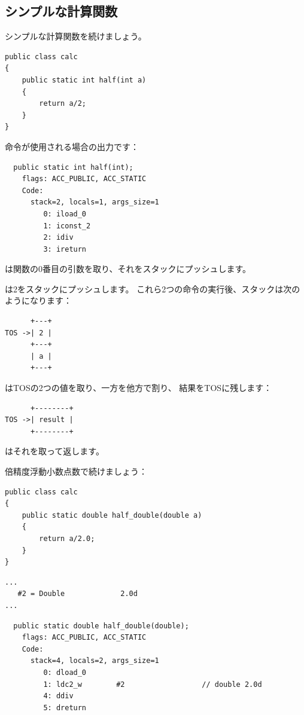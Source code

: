 \subsection{シンプルな計算関数}

シンプルな計算関数を続けましょう。

\begin{lstlisting}[style=customjava]
public class calc
{
	public static int half(int a)
	{
		return a/2;
	}
}
\end{lstlisting}

命令が使用される場合の出力です：

\begin{lstlisting}
  public static int half(int);
    flags: ACC_PUBLIC, ACC_STATIC
    Code:
      stack=2, locals=1, args_size=1
         0: iload_0       
         1: iconst_2      
         2: idiv          
         3: ireturn       
\end{lstlisting}
         
は関数の0番目の引数を取り、それをスタックにプッシュします。

は2をスタックにプッシュします。
これら2つの命令の実行後、スタックは次のようになります：

\begin{lstlisting}
      +---+
TOS ->| 2 |
      +---+
      | a |
      +---+
\end{lstlisting}

は\ac{TOS}の2つの値を取り、一方を他方で割り、
結果を\ac{TOS}に残します：

\begin{lstlisting}
      +--------+
TOS ->| result |
      +--------+
\end{lstlisting}

はそれを取って返します。

倍精度浮動小数点数で続けましょう：

\begin{lstlisting}[style=customjava]
public class calc
{
	public static double half_double(double a)
	{
		return a/2.0;
	}
}
\end{lstlisting}

\begin{lstlisting}[caption=定数プール]
...
   #2 = Double             2.0d
...
\end{lstlisting}

\begin{lstlisting}
  public static double half_double(double);
    flags: ACC_PUBLIC, ACC_STATIC
    Code:
      stack=4, locals=2, args_size=1
         0: dload_0       
         1: ldc2_w        #2                  // double 2.0d
         4: ddiv          
         5: dreturn       
\end{lstlisting}

